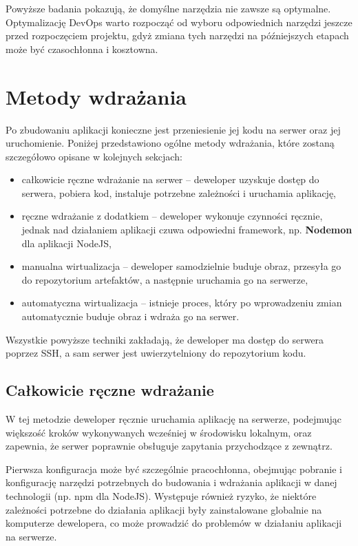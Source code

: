 \documentclass{article}
\begin{document}
Powyższe badania pokazują, że domyślne narzędzia nie zawsze są optymalne. Optymalizację DevOps warto rozpocząć od wyboru odpowiednich narzędzi jeszcze przed rozpoczęciem projektu, gdyż zmiana tych narzędzi na późniejszych etapach może być czasochłonna i kosztowna.

\section{Metody wdrażania} \label{sectionMetodyWdrazania}

Po zbudowaniu aplikacji konieczne jest przeniesienie jej kodu na serwer oraz jej uruchomienie. Poniżej przedstawiono ogólne metody wdrażania, które zostaną szczegółowo opisane w kolejnych sekcjach:

\begin{itemize}
    \item całkowicie ręczne wdrażanie na serwer – deweloper uzyskuje dostęp do serwera, pobiera kod, instaluje potrzebne zależności i uruchamia aplikację,
    \item ręczne wdrażanie z dodatkiem – deweloper wykonuje czynności ręcznie, jednak nad działaniem aplikacji czuwa odpowiedni framework, np. \textbf{Nodemon} dla aplikacji NodeJS\cite{NodemonArticle},
    \item manualna wirtualizacja – deweloper samodzielnie buduje obraz, przesyła go do repozytorium artefaktów, a następnie uruchamia go na serwerze,
    \item automatyczna wirtualizacja – istnieje proces, który po wprowadzeniu zmian automatycznie buduje obraz i wdraża go na serwer.
\end{itemize}

Wszystkie powyższe techniki zakładają, że deweloper ma dostęp do serwera poprzez SSH, a sam serwer jest uwierzytelniony do repozytorium kodu.

\subsection{Całkowicie ręczne wdrażanie}

W tej metodzie deweloper ręcznie uruchamia aplikację na serwerze, podejmując większość kroków wykonywanych wcześniej w środowisku lokalnym, oraz zapewnia, że serwer poprawnie obsługuje zapytania przychodzące z zewnątrz.

Pierwsza konfiguracja może być szczególnie pracochłonna, obejmując pobranie i konfigurację narzędzi potrzebnych do budowania i wdrażania aplikacji w danej technologii (np. npm dla NodeJS). Występuje również ryzyko, że niektóre zależności potrzebne do działania aplikacji były zainstalowane globalnie na komputerze dewelopera, co może prowadzić do problemów w działaniu aplikacji na serwerze.
\end{document}
